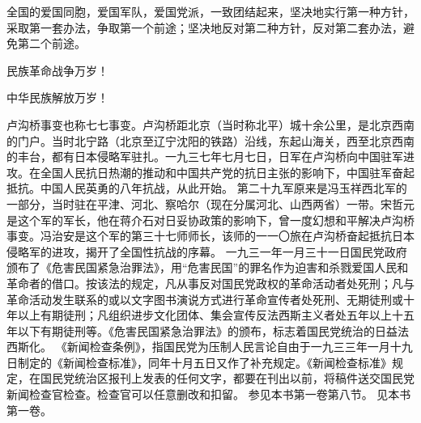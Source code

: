 全国的爱国同胞，爱国军队，爱国党派，一致团结起来，坚决地实行第一种方针，采取第一套办法，争取第一个前途；坚决地反对第二种方针，反对第二套办法，避免第二个前途。

民族革命战争万岁！

中华民族解放万岁！


\begin{maonote}
卢沟桥事变也称七七事变。卢沟桥距北京（当时称北平）城十余公里，是北京西南的门户。当时北宁路（北京至辽宁沈阳的铁路）沿线，东起山海关，西至北京西南的丰台，都有日本侵略军驻扎。一九三七年七月七日，日军在卢沟桥向中国驻军进攻。在全国人民抗日热潮的推动和中国共产党的抗日主张的影响下，中国驻军奋起抵抗。中国人民英勇的八年抗战，从此开始。
第二十九军原来是冯玉祥西北军的一部分，当时驻在平津、河北、察哈尔（现在分属河北、山西两省）一带。宋哲元是这个军的军长，他在蒋介石对日妥协政策的影响下，曾一度幻想和平解决卢沟桥事变。冯治安是这个军的第三十七师师长，该师的一一〇旅在卢沟桥奋起抵抗日本侵略军的进攻，揭开了全国性抗战的序幕。
一九三一年一月三十一日国民党政府颁布了《危害民国紧急治罪法》，用“危害民国”的罪名作为迫害和杀戮爱国人民和革命者的借口。按该法的规定，凡从事反对国民党政权的革命活动者处死刑；凡与革命活动发生联系的或以文字图书演说方式进行革命宣传者处死刑、无期徒刑或十年以上有期徒刑；凡组织进步文化团体、集会宣传反法西斯主义者处五年以上十五年以下有期徒刑等。《危害民国紧急治罪法》的颁布，标志着国民党统治的日益法西斯化。
《新闻检查条例》，指国民党为压制人民言论自由于一九三三年一月十九日制定的《新闻检查标准》，同年十月五日又作了补充规定。《新闻检查标准》规定，在国民党统治区报刊上发表的任何文字，都要在刊出以前，将稿件送交国民党新闻检查官检查。检查官可以任意删改和扣留。
参见本书第一卷第八节。
见本书第一卷。
\end{maonote}
